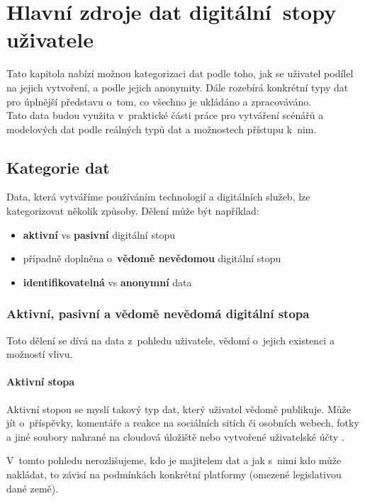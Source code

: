 \chapter{Hlavní zdroje dat digitální~stopy\\ uživatele}

Tato kapitola nabízí možnou kategorizaci dat podle toho, jak se uživatel podílel na jejich vytvoření, a podle jejich anonymity. Dále rozebírá konkrétní typy dat pro úplnější představu o~tom, co všechno je ukládáno a zpracováváno.\\
Tato data budou využita v~praktické části práce pro vytváření scénářů a modelových dat podle reálných typů dat a možnostech přístupu k~nim.

\section{Kategorie dat}
Data, která vytváříme používáním technologií a digitálních služeb, lze kategorizovat několik způsoby. Dělení může být například:
\begin{itemize}
	\item \textbf{aktivní} vs \textbf{pasivní} digitální stopu \citep{pew-digital-footprint}
    \item případně doplněna o~\textbf{vědomě nevědomou} digitální stopu \citep{fish-digital-footprint}
	\item \textbf{identifikovatelná} vs \textbf{anonymní} data 
\end{itemize}


\subsection{Aktivní, pasivní a vědomě nevědomá digitální stopa}
Toto dělení se dívá na data z~pohledu uživatele, vědomí o~jejich existenci a možností vlivu. 

\subsubsection*{Aktivní stopa}
Aktivní stopou se myslí takový typ dat, který uživatel vědomě publikuje. Může jít o~příspěvky, komentáře a reakce na sociálních sitích či osobních webech, fotky a jiné soubory nahrané na cloudová úložiště nebo vytvořené uživatelské účty \citep{pew-digital-footprint}.

V~tomto pohledu nerozlišujeme, kdo je majitelem dat a jak s~nimi kdo může nakládat, to závisí na podmínkách konkrétní platformy (omezené legislativou dané země).

